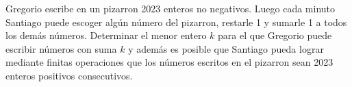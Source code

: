 \begin{problem}
    Gregorio escribe en un pizarron 2023 enteros no negativos. Luego cada minuto Santiago puede escoger alg\'un n\'umero del pizarron, restarle 1
    y sumarle 1 a todos los dem\'as n\'umeros. Determinar el menor entero $k$ para el que Gregorio puede escribir n\'umeros con suma $k$ y adem\'as
    es posible que Santiago pueda lograr mediante finitas operaciones que los n\'umeros escritos en el pizarron sean 2023 enteros positivos consecutivos.
    \label{24MEXIBEROTSTC1}
\end{problem}
